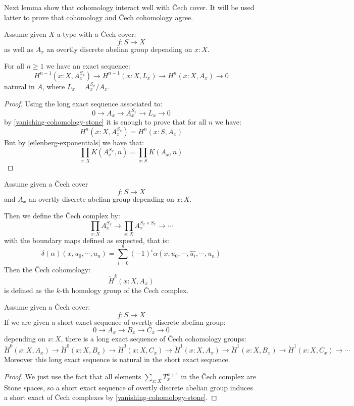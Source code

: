 Next lemma show that cohomology interact well with \v{C}ech cover. It will be used latter to prove that cohomology and \v{C}ech cohomology agree.

\begin{lemma}\label{inductive-definition-cohomology}
Assume given $X$ a type with a \v{C}ech cover:
\[f:S\to X\]
as well as $A_x$ an overtly discrete abelian group depending on $x:X$.

For all $n\geq 1$ we have an exact sequence:
\[H^{n-1}(x:X,A_x^{S_x}) \to H^{n-1}(x:X,L_x)\to H^n(x:X,A_x)\to 0\]
natural in $A$, where $L_x = A_x^{S_x}/A_x$.
\end{lemma}

\begin{proof}
Using the long exact sequence associated to:
\[0\to A_x\to A_x^{S_x}\to L_x\to 0\]
by \cref{vanishing-cohomology-stone} it is enough to prove that for all $n$ we have:
\[H^n(x:X,A_x^{S_x}) = H^n(x:S,A_x)\]
But by \cref{eilenberg-exponentials} we have that:
\[\prod_{x:X}K(A_x^{S_x},n) = \prod_{x:S}K(A_x,n)\]
\end{proof}

\begin{definition}
Assume given a \v{C}ech cover
\[f:S\to X\]
and $A_x$ an overtly discrete abelian group depending on $x:X$.

Then we define the \v{C}ech complex by:
\[\prod_{x:X}A_x^{S_x} \to \prod_{x:X}A_x^{S_x\times S_x} \to \cdots\]
with the boundary maps defined as expected, that is:
\[\delta(\alpha)(x,u_0,\cdots,u_n) = \sum_{i=0}^n (-1)^i\alpha(x,u_0,\cdots,\hat{u_i},\cdots,u_n)\]
Then the \v{C}ech cohomology:
\[\check{H}^k(x:X,A_x)\]
is defined as the $k$-th homology group of the \v{C}ech complex.
\end{definition}

\begin{lemma}
Assume given a \v{C}ech cover:
\[f:S\to X\]
If we are given a short exact sequence of overtly discrete abelian group:
\[0\to A_x\to B_x\to C_x\to 0\]
depending on $x:X$, there is a long exact sequence of \v{C}ech cohomology groups:
\[\check{H}^0(x:X,A_x) \to\check{H}^0(x:X,B_x) \to\check{H}^0(x:X,C_x) \to\check{H}^1(x:X,A_x) \to\check{H}^1(x:X,B_x) \to\check{H}^1(x:X,C_x) \to\cdots \]
Moreover this long exact sequence is natural in the short exact sequence.
\end{lemma}

\begin{proof}
We just use the fact that all elements $\sum_{x:X} T_x^{k+1}$ in the \v{C}ech complex are Stone spaces, so a short exact sequence of overtly discrete abelian group induces a short exact of \v{C}ech complexes by \cref{vanishing-cohomology-stone}.
\end{proof}


